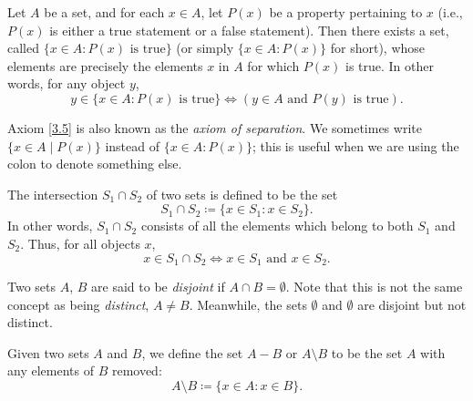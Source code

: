 \begin{axiom}\label{3.5}
Let \(A\) be a set, and for each \(x \in A\), let \(P(x)\) be a property pertaining to \(x\) (i.e., \(P(x)\) is either a true statement or a false statement).
Then there exists a set, called \(\{x \in A : P(x) \text{ is true}\}\) (or simply \(\{x \in A : P(x)\}\) for short), whose elements are precisely the elements \(x\) in \(A\) for which \(P(x)\) is true.
In other words, for any object \(y\),
\[
    y \in \{x \in A : P(x) \text{ is true}\} \iff (y \in A \text{ and } P(y) \text{ is true}).
\]
\end{axiom}

\begin{note}
Axiom \ref{3.5} is also known as the \emph{axiom of separation}.
We sometimes write \(\{x \in A \mid P(x)\}\) instead of \(\{x \in A : P(x)\}\);
this is useful when we are using the colon \say{:} to denote something else.
\end{note}

\setcounter{theorem}{22}
\begin{definition}[Intersections]\label{3.1.23}
The intersection \(S_1 \cap S_2\) of two sets is defined to be the set
\[
    S_1 \cap S_2 \coloneqq \{x \in S_1 : x \in S_2\}.
\]
In other words, \(S_1 \cap S_2\) consists of all the elements which belong to both \(S_1\) and \(S_2\).
Thus, for all objects \(x\),
\[
    x \in S_1 \cap S_2 \iff x \in S_1 \text{ and } x \in S_2.
\]
\end{definition}

\begin{note}
Two sets \(A\), \(B\) are said to be \emph{disjoint} if \(A \cap B = \emptyset\).
Note that this is not the same concept as being \emph{distinct}, \(A \neq B\).
Meanwhile, the sets \(\emptyset\) and \(\emptyset\) are disjoint but not distinct.
\end{note}

\setcounter{theorem}{26}
\begin{definition}\label{3.1.27}
Given two sets \(A\) and \(B\), we define the set \(A - B\) or \(A \setminus B\) to be the set \(A\) with any elements of \(B\) removed:
\[
    A \setminus B \coloneqq \{x \in A : x \in B\}.
\]
\end{definition}

